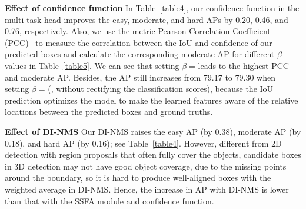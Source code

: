 \documentclass[letterpaper]{article}
\begin{document}
{\bf Effect of confidence function}
In Table~\ref{table4}, our confidence function in the multi-task head improves the easy, moderate, and hard APs by 0.20, 0.46, and 0.76, respectively.
Also, we use the metric Pearson Correlation Coefficient (PCC)~\cite{pearson} to measure the correlation between the IoU and confidence of our predicted boxes and calculate the corresponding moderate AP for different $\beta$ values in Table~\ref{table5}.
We can see that setting $\beta\;$= leads to the highest PCC and moderate AP.
Besides, the AP still increases from 79.17 to 79.30 when setting $\beta\;$= (\ie, without rectifying the classification scores), because the IoU prediction optimizes the model to make the learned features aware of the relative locations between the predicted boxes and ground truths.

{\bf Effect of DI-NMS}
Our DI-NMS raises the easy AP (by 0.38), moderate AP (by 0.18), and hard AP (by 0.16); see Table~\ref{table4}.
However, different from 2D detection with region proposals that often fully cover the objects,
candidate boxes in 3D detection may not have good object coverage, due to the missing points around the boundary, so it is hard to produce well-aligned boxes with the weighted average in DI-NMS.
Hence, the increase in AP with DI-NMS is lower than that with the SSFA module and confidence function.




\begin{table}[!th]
    \small
    \begin{center}
    \end{center}
    \vspace*{-2mm}
    \caption{Hyperparameter analysis on $\beta$ in the confidence function.
    Here, we report the 3D moderate average precision (AP$_{\text{Mod}}$) and Pearson Correlation Coefficient (PCC) between the IoU and confidence of the predicted boxes for different $\beta$ values in car detection on the KITTI val split.}
    \label{table5}
\end{table}
\end{document}

